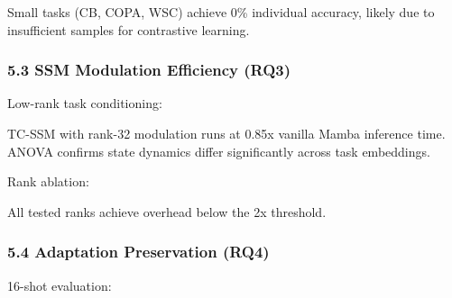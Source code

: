 Small tasks (CB, COPA, WSC) achieve 0\% individual accuracy, likely due to insufficient samples for contrastive learning.

\subsubsection{5.3 SSM Modulation Efficiency (RQ3)}

Low-rank task conditioning:

\begin{table}[htbp]
\centering
{}
\end{table}

TC-SSM with rank-32 modulation runs at 0.85x vanilla Mamba inference time. ANOVA confirms state dynamics differ significantly across task embeddings.

Rank ablation:

\begin{table}[htbp]
\centering
{}
\end{table}

All tested ranks achieve overhead below the 2x threshold.

\subsubsection{5.4 Adaptation Preservation (RQ4)}

16-shot evaluation:

\begin{table}[htbp]
\centering
{}
\end{table}

